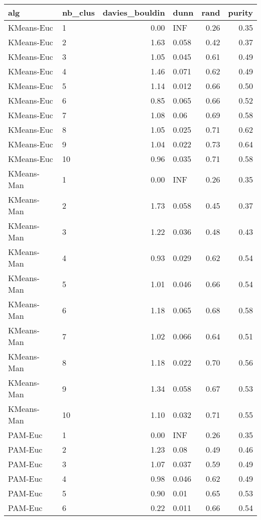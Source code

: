 \begin{table}[ht]
\centering
\begin{tabular}{llrlrr}
  \hline
alg & nb\_clus & davies\_bouldin & dunn & rand & purity \\ 
  \hline
KMeans-Euc & 1 & 0.00 & INF & 0.26 & 0.35 \\ 
  KMeans-Euc & 2 & 1.63 & 0.058 & 0.42 & 0.37 \\ 
  KMeans-Euc & 3 & 1.05 & 0.045 & 0.61 & 0.49 \\ 
  KMeans-Euc & 4 & 1.46 & 0.071 & 0.62 & 0.49 \\ 
  KMeans-Euc & 5 & 1.14 & 0.012 & 0.66 & 0.50 \\ 
  KMeans-Euc & 6 & 0.85 & 0.065 & 0.66 & 0.52 \\ 
  KMeans-Euc & 7 & 1.08 & 0.06 & 0.69 & 0.58 \\ 
  KMeans-Euc & 8 & 1.05 & 0.025 & 0.71 & 0.62 \\ 
  KMeans-Euc & 9 & 1.04 & 0.022 & 0.73 & 0.64 \\ 
  KMeans-Euc & 10 & 0.96 & 0.035 & 0.71 & 0.58 \\ 
  KMeans-Man & 1 & 0.00 & INF & 0.26 & 0.35 \\ 
  KMeans-Man & 2 & 1.73 & 0.058 & 0.45 & 0.37 \\ 
  KMeans-Man & 3 & 1.22 & 0.036 & 0.48 & 0.43 \\ 
  KMeans-Man & 4 & 0.93 & 0.029 & 0.62 & 0.54 \\ 
  KMeans-Man & 5 & 1.01 & 0.046 & 0.66 & 0.54 \\ 
  KMeans-Man & 6 & 1.18 & 0.065 & 0.68 & 0.58 \\ 
  KMeans-Man & 7 & 1.02 & 0.066 & 0.64 & 0.51 \\ 
  KMeans-Man & 8 & 1.18 & 0.022 & 0.70 & 0.56 \\ 
  KMeans-Man & 9 & 1.34 & 0.058 & 0.67 & 0.53 \\ 
  KMeans-Man & 10 & 1.10 & 0.032 & 0.71 & 0.55 \\ 
  PAM-Euc & 1 & 0.00 & INF & 0.26 & 0.35 \\ 
  PAM-Euc & 2 & 1.23 & 0.08 & 0.49 & 0.46 \\ 
  PAM-Euc & 3 & 1.07 & 0.037 & 0.59 & 0.49 \\ 
  PAM-Euc & 4 & 0.98 & 0.046 & 0.62 & 0.49 \\ 
  PAM-Euc & 5 & 0.90 & 0.01 & 0.65 & 0.53 \\ 
  PAM-Euc & 6 & 0.22 & 0.011 & 0.66 & 0.54 \\ 

\end{tabular}
\end{table}
